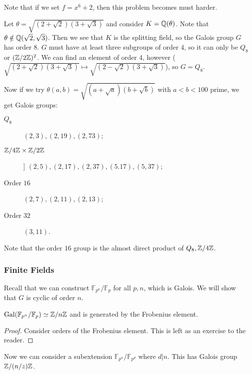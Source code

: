 \documentclass[10pt, twoside]{article}
\newcommand{\F}{\mathbb{F}}
\begin{document}
        Note that if we set $f = x^6+2$, then this problem becomes must harder.

        \begin{exm} Let $\theta = \sqrt{(2+\sqrt{2})(3+\sqrt{3})}$ and consider
            $K = \mathbb{Q}(\theta)$. Note that $\theta \notin \mathbb{Q}(\sqrt{2}, \sqrt{3})$.
            Then we see that $K$ is the splitting field, so the Galois group
            $G$ has order $8$. $G$ must have at least three subgroups of order
            $4$, so it can only be $Q_8$ or $(\mathbb{Z}/2\mathbb{Z})^2$. We can find an
            element of order $4$, however ($\sqrt{(2 + \sqrt{2})(3 + \sqrt{3})}
            \mapsto \sqrt{(2 - \sqrt{2})(3 + \sqrt{3})}$), so $G = Q_8$.
        \end{exm}

        Now if we try $\theta(a,b) = \sqrt{(a + \sqrt{a})(b + \sqrt{b})}$ with
        $a < b < 100$ prime, we get Galois groups: \begin{description}
            \item[$Q_8$] $(2,3), (2,19), (2,73)$; \item[$\mathbb{Z}/4\mathbb{Z} \times
                \mathbb{Z}/2\mathbb{Z}$]] $(2,5), (2,17), (2,37), (5.17), (5,37)$; \item[Order
        $16$] $(2,7), (2,11), (2,13)$; \item[Order $32$] $(3,11)$.
\end{description}

        Note that the order $16$ group is the almost direct product of $Q_8,
        \mathbb{Z}/4\mathbb{Z}$. 

        \subsubsection{Finite Fields} Recall that we can construct
        $\F_{p^n}/\F_p$ for all $p,n$, which is Galois. We will show that $G$
        is cyclic of order $n$.

        \begin{prop} $\mathrm{Gal}(\F_{p^n}/\F_p) \simeq \Z/n\Z$ and is
            generated by the Frobenius element.  \begin{proof} Consider orders
            of the Frobenius element. This is left as an exercise to the
        reader.  \end{proof} \end{prop}
        
        Now we can consider a subextension $\F_{p^n}/\F_{p^d}$ where $d | n$.
        This has Galois group $\mathbb{Z}/(n/z)\mathbb{Z}$.
\end{document}
